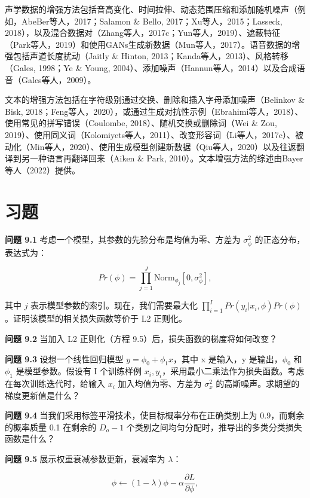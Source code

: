 \documentclass[lang=cn,newtx,10pt,scheme=chinese]{elegantbook}
\begin{document}
声学数据的增强方法包括音高变化、时间拉伸、动态范围压缩和添加随机噪声（例如，AbeBer等人，2017；Salamon \& Bello, 2017；Xu等人，2015；Lasseck, 2018），以及混合数据对（Zhang等人，2017c；Yun等人，2019）、遮蔽特征（Park等人，2019）和使用GANs生成新数据（Mun等人，2017）。语音数据的增强包括声道长度扰动（Jaitly \& Hinton, 2013；Kanda等人，2013）、风格转移（Gales, 1998；Ye \& Young, 2004）、添加噪声（Hannun等人，2014）以及合成语音（Gales等人，2009）。

文本的增强方法包括在字符级别通过交换、删除和插入字母添加噪声（Belinkov \& Bisk, 2018；Feng等人，2020），或通过生成对抗性示例（Ebrahimi等人，2018）、使用常见的拼写错误（Coulombe, 2018）、随机交换或删除词（Wei \& Zou, 2019）、使用同义词（Kolomiyets等人，2011）、改变形容词（Li等人，2017c）、被动化（Min等人，2020）、使用生成模型创建新数据（Qiu等人，2020）以及往返翻译到另一种语言再翻译回来（Aiken \& Park, 2010）。文本增强方法的综述由Bayer等人（2022）提供。

\section{习题}
\textbf{问题 9.1} 考虑一个模型，其参数的先验分布是均值为零、方差为 \(\sigma_{\phi}^2\) 的正态分布，表达式为：

\begin{equation}
Pr(\phi) = \prod_{j=1}^{J} \text{Norm}_{\phi_j} [0, \sigma_{\phi}^2], 
\end{equation}

其中 \( j \) 表示模型参数的索引。现在，我们需要最大化 \(\prod_{i=1}^{I} Pr(y_i|x_i, \phi)Pr(\phi)\)。证明该模型的相关损失函数等价于 L2 正则化。

\textbf{问题 9.2} 当加入 L2 正则化（方程 9.5）后，损失函数的梯度将如何改变？

\textbf{问题 9.3} 设想一个线性回归模型 \(y = \phi_0 + \phi_1 x\)，其中 x 是输入，y  是输出，\(\phi_0\) 和 \(\phi_1\) 是模型参数。假设有 I 个训练样例 \({x_i, y_i}\)，采用最小二乘法作为损失函数。考虑在每次训练迭代时，给输入 \(x_i\) 加入均值为零、方差为 \(\sigma_{x}^2\) 的高斯噪声。求期望的梯度更新值是什么？

\textbf{问题 9.4} 当我们采用标签平滑技术，使目标概率分布在正确类别上为 0.9，而剩余的概率质量 0.1 在剩余的 \(D_o - 1\) 个类别之间均匀分配时，推导出的多类分类损失函数是什么？

\textbf{问题 9.5} 展示权重衰减参数更新，衰减率为 \(\lambda\)：

\begin{equation}
\phi \leftarrow (1 - \lambda) \phi - \alpha \frac{\partial L}{\partial \phi}, 
\end{equation}
\end{document}
